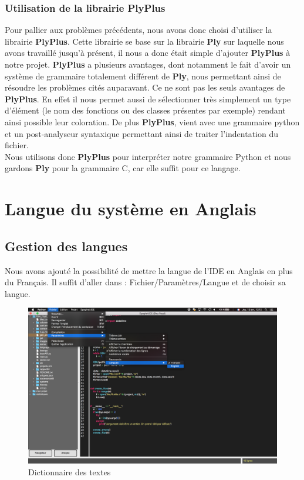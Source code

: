 \documentclass[a4paper,12pt]{article}
\begin{document}
		\subsubsection{Utilisation de la librairie PlyPlus}

			Pour pallier aux problèmes précédents, nous avons donc choisi d'utiliser la librairie \textbf{PlyPlus}. Cette librairie se base sur la librairie \textbf{Ply} sur laquelle nous avons travaillé jusqu'à présent, il nous a donc était simple d'ajouter \textbf{PlyPlus} à notre projet. \textbf{PlyPlus} a plusieurs avantages, dont notamment le fait d'avoir un système de grammaire totalement différent de \textbf{Ply}, nous permettant ainsi de résoudre les problèmes cités auparavant. Ce ne sont pas les seuls avantages de \textbf{PlyPlus}. En effet il nous permet aussi de sélectionner très simplement un type d'élément (le nom des fonctions ou des classes présentes par exemple) rendant ainsi possible leur coloration. De plus \textbf{PlyPlus}, vient avec une grammaire python et un post-analyseur syntaxique permettant ainsi de traiter l'indentation du fichier. \\
			
			Nous utilisons donc \textbf{PlyPlus} pour interpréter notre grammaire Python et nous gardons \textbf{Ply} pour la grammaire C, car elle suffit pour ce langage.


\section{Langue du système en Anglais}

	\subsection{Gestion des langues}

	Nous avons ajouté la possibilité de mettre la langue de l'IDE en Anglais en plus du Français. Il suffit d'aller dans : Fichier/Paramètres/Langue et de choisir sa langue.\\
	
	\begin{figure}[h!]
			\begin{center}
					\includegraphics[scale=0.3]{images/langues}
					\caption{Dictionnaire des textes}
			\end{center}
	\end{figure}
	
\end{document}
